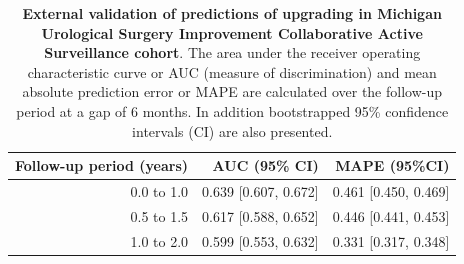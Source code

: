 \begin{table}[!htb]
\small\sf\centering
\caption{\textbf{External validation of predictions of upgrading in Michigan Urological Surgery Improvement Collaborative Active Surveillance cohort}. The area under the receiver operating characteristic curve or AUC (measure of discrimination) and mean absolute prediction error or MAPE are calculated over the follow-up period at a gap of 6 months. In addition bootstrapped 95\% confidence intervals (CI) are also presented.}
\label{tab:AUC_PE_MUSIC}
\begin{tabular}{r|r|r}
\hline
\hline
Follow-up period (years) & AUC (95\% CI) & MAPE (95\%CI)\\ 
\hline
0.0 to 1.0 & 0.639 [0.607, 0.672] & 0.461 [0.450, 0.469]\\
0.5 to 1.5 & 0.617 [0.588, 0.652] & 0.446 [0.441, 0.453]\\
1.0 to 2.0 & 0.599 [0.553, 0.632] & 0.331 [0.317, 0.348]\\
\hline
\end{tabular}    
\end{table}